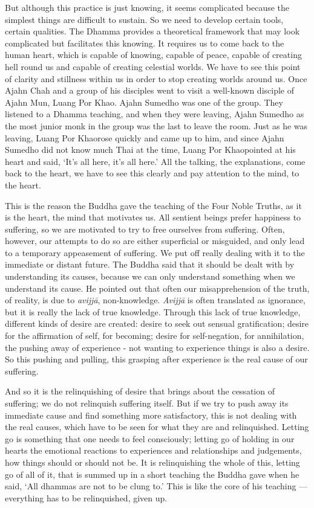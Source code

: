 But although this practice is just knowing, it seems complicated because
the simplest things are difficult to sustain. So we need to develop
certain tools, certain qualities. The Dhamma provides a theoretical
framework that may look complicated but facilitates this knowing. It
requires us to come back to the human heart, which is capable of
knowing, capable of peace, capable of creating hell round us and capable
of creating celestial worlds. We have to see this point of clarity and
stillness within us in order to stop creating worlds around us. Once
Ajahn Chah and a group of his disciples went to visit a well-known
disciple of Ajahn Mun, Luang Por Khao. Ajahn Sumedho was one of the
group. They listened to a Dhamma teaching, and when they were leaving,
Ajahn Sumedho as the most junior monk in the group was the last to leave
the room. Just as he was leaving, Luang Por Khaorose quickly and came up
to him, and since Ajahn Sumedho did not know much Thai at the time,
Luang Por Khaopointed at his heart and said, `It's all here, it's all
here.' All the talking, the explanations, come back to the heart, we
have to see this clearly and pay attention to the mind, to the heart.

This is the reason the Buddha gave the teaching of the Four Noble
Truths, as it is the heart, the mind that motivates us. All sentient
beings prefer happiness to suffering, so we are motivated to try to free
ourselves from suffering. Often, however, our attempts to do so are
either superficial or misguided, and only lead to a temporary
appeasement of suffering. We put off really dealing with it to the
immediate or distant future. The Buddha said that it should be dealt
with by understanding its causes, because we can only understand
something when we understand its cause. He pointed out that often our
misapprehension of the truth, of reality, is due to \emph{avijjā},
non-knowledge. \emph{Avijjā} is often translated as ignorance, but it is
really the lack of true knowledge. Through this lack of true knowledge,
different kinds of desire are created: desire to seek out sensual
gratification; desire for the affirmation of self, for becoming; desire
for self-negation, for annihilation, the pushing away of experience -
not wanting to experience things is also a desire. So this pushing and
pulling, this grasping after experience is the real cause of our
suffering.

And so it is the relinquishing of desire that brings about the cessation
of suffering; we do not relinquish suffering itself. But if we try to
push away its immediate cause and find something more satisfactory, this
is not dealing with the real causes, which have to be seen for what they
are and relinquished. Letting go is something that one needs to feel
consciously; letting go of holding in our hearts the emotional reactions
to experiences and relationships and judgements, how things should or
should not be. It is relinquishing the whole of this, letting go of all
of it, that is summed up in a short teaching the Buddha gave when he
said, `All dhammas are not to be clung to.' This is like the core of his
teaching --- everything has to be relinquished, given up.

